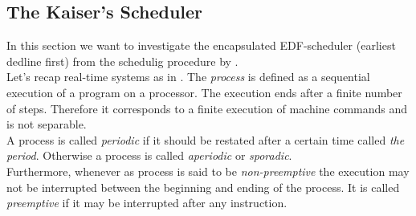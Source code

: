 \subsection{The Kaiser's Scheduler}









In this section we want to investigate the encapsulated EDF-scheduler (earliest dedline first) from the schedulig procedure by \cite{K}. \\

Let's recap \glspl{real-time system} as in \cite{KBK}.
The {\itshape process} is defined as a sequential execution of a program on a processor. 
The execution ends after a finite number of steps. 
Therefore it corresponds to a finite execution of machine commands and is not separable.\\
A process is called {\itshape periodic} if it should be restated after a certain time called {\itshape the period}. 
Otherwise a process is called {\itshape aperiodic} or {\itshape sporadic}.\\

Furthermore, whenever as process is said to be {\itshape non-preemptive} the execution may not be interrupted between the beginning and ending of the process. 
It is called {\itshape preemptive} if it may be interrupted after any instruction.\\  
 
